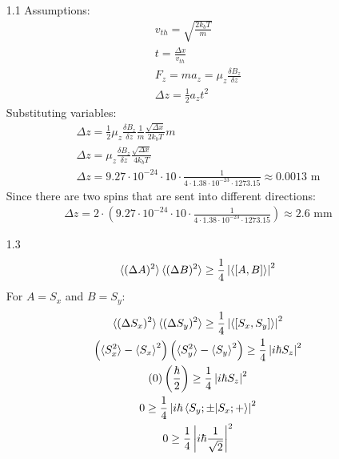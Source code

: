\documentclass[12pt]{article}
\begin{document}
\begin{enumerate}
\begin{enumerate}
\begin{gather*}
            \end{gather*}
        \end{enumerate}
        \item[1.1]
        Assumptions:
        \begin{gather*}
            v_{th}=\sqrt{\frac{2k_b T}{m}}\\
            t=\frac{\Delta x}{v_{th}}\\
            F_z=ma_z=\mu_z\frac{\delta B_z}{\delta z}\\
            \Delta z=\frac{1}{2}a_z t^2
        \end{gather*}
        Substituting variables:
        \begin{gather*}
            \Delta z=\frac{1}{2}\mu_z\frac{\delta B_z}{\delta z}\frac{1}{m}\frac{\sqrt{\Delta x}}{2k_b T}m\\
            \Delta z=\mu_z\frac{\delta B_z}{\delta z}\frac{\sqrt{\Delta x}}{4k_b T}\\
            \Delta z=9.27\cdot10^{-24}\cdot10\cdot\frac{1}{4\cdot1.38\cdot10^{-23}\cdot1273.15}\approx0.0013\text{ m}
        \end{gather*}
        Since there are two spins that are sent into different directions:
        \begin{gather*}
            \Delta z=2\cdot\left(9.27\cdot10^{-24}\cdot10\cdot\frac{1}{4\cdot1.38\cdot10^{-23}\cdot1273.15}\right)\approx2.6\text{ mm}
        \end{gather*}
        \item[1.3]
        \begin{gather*}
            \braket{(\Delta A)^2}\braket{(\Delta B)^2}\geq\frac{1}{4}\left|\braket{\left[A,B\right]}\right|^2
        \end{gather*}
        For $A=S_x$ and $B=S_y$:
        \begin{gather*}
            \braket{(\Delta S_x)^2}\braket{(\Delta S_y)^2}\geq\frac{1}{4}\left|\braket{\left[S_x,S_y\right]}\right|^2\\
            \left(\braket{S_x^2}-\braket{S_x}^2\right)\left(\braket{S_y^2}-\braket{S_y}^2\right)\geq\frac{1}{4}\left|i\hbar S_z\right|^2\\
            \left(0\right)
            \left(\frac{\hbar}{2}\right)
            \geq\frac{1}{4}\left|i\hbar S_z\right|^2\\
            0\geq\frac{1}{4}\left|i\hbar \braket{S_y ;\pm|S_x ;+}\right|^2\\
            0\geq\frac{1}{4}\left|i\hbar \frac{1}{\sqrt{2}}\right|^2\\

\end{gather*}
\end{enumerate}
\end{document}
